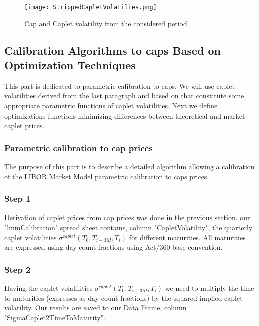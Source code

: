 \documentclass[11pt]{article}
\numberwithin{equation}{subsection}
\begin{document}
\begin{figure}[H]
	\texttt{[image: StrippedCapletVolatilies.png]}
    \caption{Cap and Caplet volatility from the considered period}	
\end{figure}
\subsection{Calibration Algorithms to caps Based on Optimization Techniques}
This part is dedicated to parametric calibration to caps. We will use caplet volatilities derived from the last paragraph and based on that constitute some appropriate parametric functions of caplet volatilities. Next we define optimizations functions minimizing differences between theoretical and market caplet prices.
\subsubsection{Parametric calibration to cap prices}
The purpose of this part is to describe a detailed algorithm allowing a calibration of the LIBOR Market Model parametric calibration to caps prices.
\subsubsection*{Step 1}
Derivation of caplet prices from cap prices was done in the previous section.
our "lmmCalibration" spread sheet contains, column "CapletVolatility", the quarterly caplet volatilities \(\sigma^{caplet}(T_{0}, T_{i-3M}, T_{i})\) for
different maturities. All maturities are expressed using day count fractions using Act/360
base convention.
\subsubsection*{Step 2}
Having the caplet volatilities \(\sigma^{caplet}(T_{0}, T_{i-3M}, T_{i})\) we need to multiply the time to maturities
(expresses as day count fractions) by the squared implied caplet volatility. Our results are saved to our Data Frame, column "SigmaCaplet2TimeToMaturity".
\end{document}
